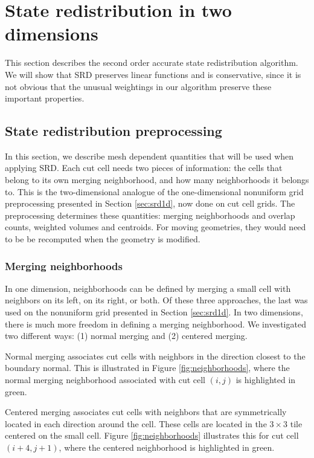 \section{State redistribution in two dimensions}\label{sec:srdAlg}

This section describes the second order accurate
state redistribution algorithm. 
We will show that SRD preserves linear functions and is conservative, since
it is not obvious that the unusual weightings in our algorithm
preserve these important properties.

\subsection{State redistribution preprocessing}\label{sec:preprocessing}


In this section, we describe mesh dependent quantities that will be used when 
applying SRD. 
Each cut cell needs two pieces of information: the 
cells that belong to its own merging neighborhood,
and how many neighborhoods it belongs to.
This is the two-dimensional analogue of the one-dimensional 
nonuniform grid preprocessing presented in Section \ref{sec:srd1d}, now done on cut cell grids.
The preprocessing determines these quantities: merging neighborhoods and overlap counts, 
weighted volumes and centroids.
For moving geometries, they would need to be be recomputed
when the geometry is modified.

\subsubsection*{Merging neighborhoods}

In one dimension, neighborhoods can be defined by merging a small cell with neighbors on its left, on its right, or both.  Of these three approaches, the last was used on the nonuniform grid presented in Section \ref{sec:srd1d}.
In two dimensions, there is much more freedom in defining a merging neighborhood.  
We investigated two different ways: (1) normal merging and (2) centered merging.

Normal merging associates cut cells with neighbors in the direction closest to the 
boundary normal.  This is illustrated in Figure \ref{fig:neighborhoods},
where the normal merging neighborhood associated with cut cell $(i,j)$ is highlighted in green.

Centered merging associates cut cells with neighbors that are 
symmetrically located in each direction around the cell.
These cells are located in the $3 \times 3$ tile centered on the small cell.  Figure \ref{fig:neighborhoods}
illustrates this for cut cell $(i+4,j+1)$, where the centered neighborhood is highlighted in green.

